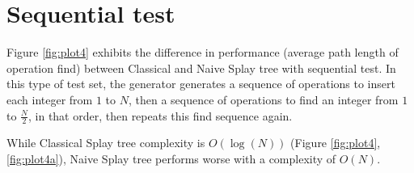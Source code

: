 \documentclass{article}
\begin{document}
\section{Sequential test} \label{seq}

Figure \ref{fig:plot4} exhibits the difference in performance (average path length of operation find) between Classical and Naive Splay tree with sequential test. In this type of test set, the generator generates a sequence of operations to insert each integer from $1$ to $N$, then a sequence of operations to find an integer from $1$ to $\frac{N}{2}$, in that order, then repeats this find sequence again.

While Classical Splay tree complexity is $O(\log(N))$ (Figure \ref{fig:plot4}, \ref{fig:plot4a}), Naive Splay tree performs worse with a complexity of $O(N)$.
\end{document}
